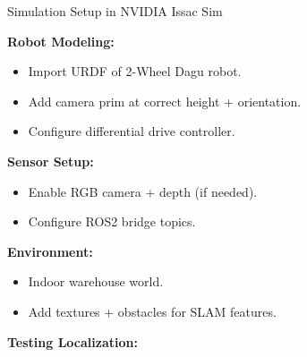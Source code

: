 \begin{frame}[allowframebreaks]{Simulation Setup in NVIDIA Issac Sim}

\textbf{Robot Modeling:}
\begin{itemize}
  \item Import URDF of 2-Wheel Dagu robot.  
  \item Add camera prim at correct height + orientation.  
  \item Configure differential drive controller.  
\end{itemize}

\textbf{Sensor Setup:}
\begin{itemize}
  \item Enable RGB camera + depth (if needed).  
  \item Configure ROS2 bridge topics.  
\end{itemize}

\textbf{Environment:}
\begin{itemize}
  \item Indoor warehouse world.  
  \item Add textures + obstacles for SLAM features.  
\end{itemize}

\framebreak

\textbf{Testing Localization:}


\end{frame}
